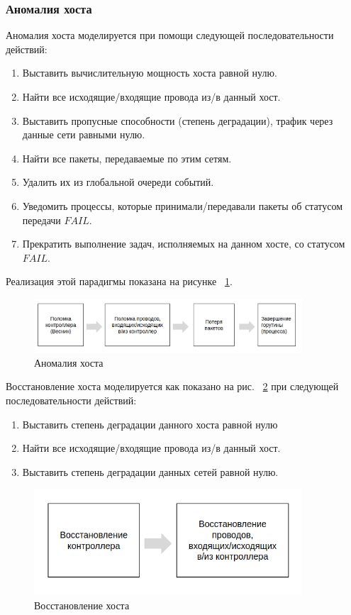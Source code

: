 \subsubsection{Аномалия хоста}

Аномалия хоста моделируется при помощи следующей последовательности действий:

\begin{enumerate}
\item Выставить вычислительную мощность хоста равной нулю.
\item Найти все исходящие/входящие провода из/в данный хост.
\item Выставить пропусные способности (степень деградации), трафик через данные сети равными нулю.
\item Найти все пакеты, передаваемые по этим сетям. 
\item Удалить их из глобальной очереди событий. 
\item Уведомить процессы, которые принимали/передавали пакеты об статусом передачи $FAIL$.
\item Прекратить выполнение задач, исполняемых на данном хосте, со статусом $FAIL$.

\end{enumerate}

Реализация этой парадигмы показана на рисунке ~\ref{fig:anom-host}.

\begin{figure}[!ht]
\centering
\includegraphics[width=10cm]{Kenenbek/images/anom-scheme-host.png}
\caption{Аномалия хоста}
\label{fig:anom-host}
\end{figure}

Восстановление хоста моделируется как показано на рис. ~\ref{fig:repai-host} при следующей последовательности действий:

\begin{enumerate}
\item Выставить степень деградации данного хоста равной нулю
\item Найти все исходящие/входящие провода из/в данный хост.
\item Выставить степень деградации данных сетей равной нулю.
\end{enumerate}

\begin{figure}[!ht]
\centering
\includegraphics[width=10cm]{Kenenbek/images/repair-host.png}
\caption{Восстановление хоста}
\label{fig:repai-host}
\end{figure}

